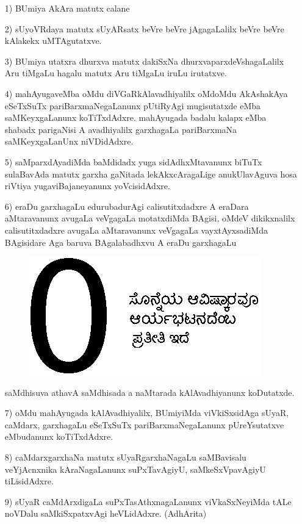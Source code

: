 \begin{itemize}
\item[{\rm 1)}] BUmiya AkAra matutx calane
  
\item[{\rm 2)}] sUyoVRdaya matutx sUyARsatx beVre beVre jAgagaLalilx beVre beVre kAlakekx uMTAgutatxve.
  
\item[{\rm 3)}] BUmiya utatxra dhurxva matutx dakiSxNa dhurxvaparxdeVshagaLalilx Aru tiMgaLu hagalu matutx Aru tiMgaLu iruLu irutatxve.

\item[{\rm 4)}] mahAyugaveMba oMdu diVGaRkAlavadhiyalilx oMdoMdu AkAshakAya eSeTxSuTx pariBarxmaNegaLanunx pUtiRyAgi mugisutatxde eMba saMKeyxgaLanunx koTiTxdAdxre. mahAyugada badalu kalapx eMba shabadx parigaNisi A avadhiyalilx garxhagaLa pariBarxmaNa saMKeyxgaLanUnx niVDidAdxre. 

\item[{\rm 5)}] saMparxdAyadiMda baMdidadx yuga sidAdhxMtavanunx biTuTx sulaBavAda matutx garxha gaNitada lekAkxcAragaLige anukUlavAguva hosa riVtiya yugaviBajaneyanunx yoVcisidAdxre. 

\item[{\rm 6)}] eraDu garxhagaLu edurubadurAgi calisutitxdadxre A eraDara aMtaravanunx avugaLa veVgagaLa motatxdiMda BAgisi, oMdeV dikikxnalilx calisutitxdadxre avugaLa aMtaravanunx veVgagaLa vayxtAyxsadiMda BAgisidare Aga baruva BAgalabadhxvu A eraDu garxhagaLu
\begin{figure}[H]
\centering
\includegraphics[scale=0.8]{src/figures/fig17.eps}
\end{figure}
   saMdhisuva athavA saMdhisada a naMtarada kAlAvadhiyanunx koDutatxde.
  
\item[{\rm 7)}] oMdu mahAyugada kAlAvadhiyalilx, BUmiyiMda viVkiSxsidAga sUyaR, caMdarx, garxhagaLu eSeTxSuTx pariBarxmaNegaLanunx pUreYsutatxve eMbudanunx koTiTxdAdxre. 

\item[{\rm 8)}] caMdarxgarxhaNa matutx sUyaRgarxhaNagaLu saMBavisalu veYjAcnxnika kAraNagaLanunx suPxTavAgiyU, saMkeSxVpavAgiyU tiLisidAdxre. 
  
\item[{\rm 9)}] sUyaR caMdArxdigaLa suPxTasAthxnagaLanunx viVkaSxNeyiMda tALe noVDalu saMkiSxpatxvAgi heVLidAdxre. \hfill{(AdhArita)}
\end{itemize}
